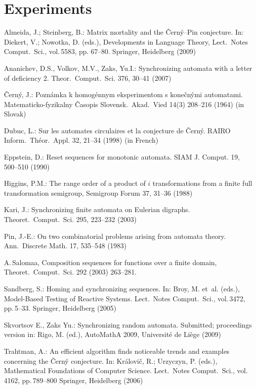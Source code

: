 \documentclass[11pt]{llncs}
\begin{document}
\section{Experiments}
\label{experiments}

\begin{thebibliography}{99}
Almeida, J.; Steinberg, B.: Matrix mortality and the \v{C}ern\'{y}--Pin
conjecture. In:  Diekert, V.; Nowotka, D. (eds.), Developments in
Language Theory, Lect.\ Notes Comput.\ Sci., vol.\,5583, pp. 67--80.
Springer, Heidelberg (2009)

Ananichev, D.S., Volkov, M.V., Zaks, Yu.I.: Synchronizing automata
with a letter of deficiency 2. Theor.\ Comput.\ Sci. 376, 30--41 (2007)

\v{C}ern\'{y}, J.: Pozn\'{a}mka k homog\'{e}nnym eksperimentom s
kone\v{c}n\'{y}mi automatami. Matematicko-fyzikalny \v{C}asopis
Slovensk.\ Akad.\ Vied 14(3) 208--216 (1964) (in Slovak)

Dubuc, L.: Sur les automates circulaires et la conjecture de
\v{C}ern\'y. RAIRO Inform.\ Th\'eor.\ Appl. 32, 21--34 (1998) (in
French)

Eppstein, D.: Reset sequences for monotonic automata. SIAM J.
Comput. 19, 500--510 (1990)

Higgins, P.M.: The range order of a product of $i$ transformations
from a finite full transformation semigroup, Semigroup Forum 37, 31--36
(1988)

Kari, J.: Synchronizing finite automata on Eulerian digraphs.
Theoret.\ Comput.\ Sci. 295, 223--232 (2003)

Pin, J.-E.: On two combinatorial problems arising from automata
theory. Ann.\ Discrete Math. 17, 535--548 (1983)

A.\,Salomaa, Composition sequences for functions over a finite
domain, Theoret.\ Comput.\ Sci. 292 (2003) 263--281.

Sandberg, S.: Homing and synchronizing sequences. In: Broy, M.
et~al. (eds.), Model-Based Testing of Reactive Systems. Lect.\
Notes Comput.\ Sci., vol.\,3472, pp.\,5--33. Springer, Heidelberg
(2005)

Skvortsov E., Zaks Yu.: Synchronizing random automata. Submitted;
proceedings version in: Rigo, M. (ed.), AutoMathA 2009, Universit\'e
de Li\`ege (2009)

Trahtman, A.: An efficient algorithm finds noticeable trends
and examples concerning the \v{C}ern\'y conjecture. In:
Kr\'alovi\v{c}, R.; Urzyczyn, P. (eds.), Mathematical Foundations
of Computer Science. Lect.\ Notes Comput.\ Sci., vol.\,4162, pp.\,789--800
Springer, Heidelberg (2006)


\end{thebibliography}
\end{document}
